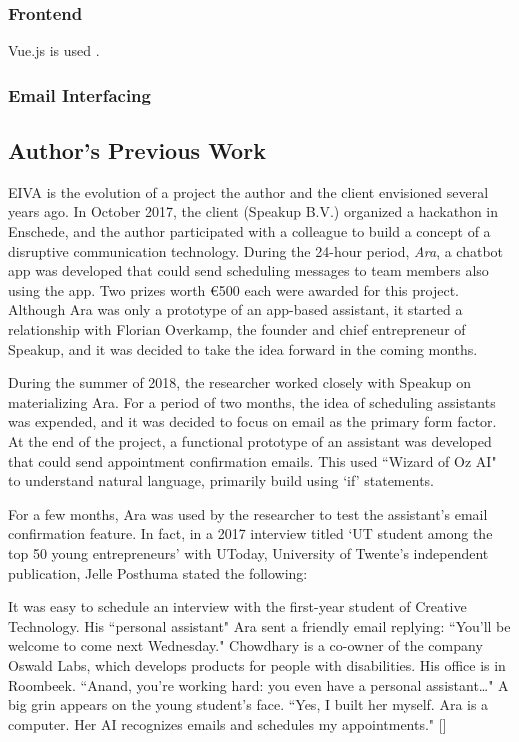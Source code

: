 \documentclass{article}
\begin{document}
\subsubsection{Frontend}

Vue.js is used \cite{deng_development_2020}.

\subsubsection{Email Interfacing}

\subsection{Author's Previous Work}

EIVA is the evolution of a project the author and the client envisioned several years ago. In October 2017, the client (Speakup B.V.) organized a hackathon in Enschede, and the author participated with a colleague to build a concept of a disruptive communication technology. During the 24-hour period, \emph{Ara}, a chatbot app was developed that could send scheduling messages to team members also using the app. Two prizes worth €500 each were awarded for this project. Although Ara was only a prototype of an app-based assistant, it started a relationship with Florian Overkamp, the founder and chief entrepreneur of Speakup, and it was decided to take the idea forward in the coming months.

During the summer of 2018, the researcher worked closely with Speakup on materializing Ara. For a period of two months, the idea of scheduling assistants was expended, and it was decided to focus on email as the primary form factor. At the end of the project, a functional prototype of an assistant was developed that could send appointment confirmation emails. This used ``Wizard of Oz AI" to understand natural language, primarily build using `if' statements.

For a few months, Ara was used by the researcher to test the assistant's email confirmation feature. In fact, in a 2017 interview titled `UT student among the top 50 young entrepreneurs' with UToday, University of Twente's independent publication, Jelle Posthuma stated the following:

\begin{displayquote}
	It was easy to schedule an interview with the first-year student of Creative Technology. His ``personal assistant" Ara sent a friendly email replying: ``You’ll be welcome to come next Wednesday." Chowdhary is a co-owner of the company Oswald Labs, which develops products for people with disabilities. His office is in Roombeek. ``Anand, you’re working hard: you even have a personal assistant…" A big grin appears on the young student’s face. ``Yes, I built her myself. Ara is a computer. Her AI recognizes emails and schedules my appointments." []
\end{displayquote}
\end{document}

